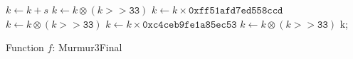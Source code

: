 \documentclass{article}
\begin{document}
\begin{algorithm}[H]
    \DontPrintSemicolon
    \BlankLine
    $k \leftarrow k + s$ \;
    $k \leftarrow k \otimes (k >> \mathtt{33})$ \;
    $k \leftarrow k \times \mathtt{0xff51afd7ed558ccd}$ \;
    $k \leftarrow k \otimes (k >> \mathtt{33})$ \;
    $k \leftarrow k \times \mathtt{0xc4ceb9fe1a85ec53}$ \;
    $k \leftarrow k \otimes  (k >> \mathtt{33})$ \;
    \BlankLine
    \Return k;
    \BlankLine
    \label{alg:murmur3final}
    \caption{Function $f$: Murmur3Final}
\end{algorithm}
\end{document}
